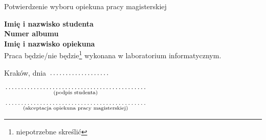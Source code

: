 \documentclass[a4paper,8pt]{article}
\newcommand{\fillField}[2]{
    $\underset{\text{#1}}{\parbox[t]{#2}{\dotfill}}$
}
\begin{document}
\begin{center}
    \huge Potwierdzenie wyboru opiekuna pracy magisterskiej
\end{center}
\vskip 2cm

\noindent \textbf{Imię i nazwisko studenta} \dotfill \\
\textbf{Numer albumu} \dotfill \\
\textbf{Imię i nazwisko opiekuna} \dotfill \\

\noindent Praca będzie/nie będzie\footnote{niepotrzebne skreślić} wykonana w
laboratorium informatycznym.
\vskip 2cm

\noindent Kraków, dnia \fillField{}{3cm}
\vskip 1cm
\begin{justify}
\noindent \fillField{(podpis studenta)}{7cm} \hskip 1.5cm
\fillField{(akceptacja opiekuna pracy magisterskiej)}{7cm}
\end{justify}
\end{document}
